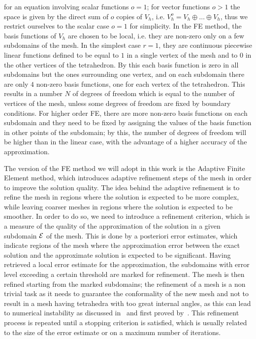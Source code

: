 for an equation involving scalar functions $o=1$; for vector functions $o>1$ the space is given by the direct sum of $o$ copies of $V_h$, i.e. $V_h^o = V_h \oplus \dots \oplus V_h$, thus we restrict ourselves to the scalar case $o=1$ for simplicity. \newline
In the FE method, the basis functions of $V_h$ are chosen to be local, i.e. they are non-zero only on a few subdomains of the mesh.
In the simplest case $r=1$, they are continuous piecewise linear functions defined to be equal to $1$ in a single vertex of the mesh and to $0$ in the other vertices of the tetrahedron. 
By this each basis function is zero in all subdomains but the ones surrounding one vertex, and on each subdomain there are only $4$ non-zero basis functions, one for each vertex of the tetrahedron.
This results in a number $N$ of degrees of freedom which is equal to the number of vertices of the mesh, unless some degrees of freedom are fixed by boundary conditions.
For higher order FE, there are more non-zero basis functions on each subdomain and they need to be fixed by assigning the values of the basis function in other points of the subdomain; by this, the number of degrees of freedom will be higher than in the linear case, with the advantage of a higher accuracy of the approximation. \medskip

The version of the FE method we will adopt in this work is the Adaptive Finite Element method, which introduces adaptive refinement steps of the mesh in order to improve the solution quality.
The idea behind the adaptive refinement is to refine the mesh in regions where the solution is expected to be more complex, while leaving coarser meshes in regions where the solution is expected to be smoother.
In order to do so, we need to introduce a refinement criterion, which is a measure of the quality of the approximation of the solution in a given subdomain $\mathcal E$ of the mesh.
This is done by a posteriori error estimates, which indicate regions of the mesh where the approximation error between the exact solution and the approximate solution is expected to be significant.
Having retrieved a local error estimate for the approximation, the subdomains with error level exceeding a certain threshold are marked for refinement.
The mesh is then refined starting from the marked subdomains; the refinement of a mesh is a non trivial task as it needs to guarantee the conformality of the new mesh and not to result in a mesh having tetrahedra with too great internal angles, as this can lead to numerical instability as discussed in~\cite[Section 4.4.3]{DeuflhardWeiser2012} and first proved by~\cite{SyngeRheinboldt1957}.
This refinement process is repeated until a stopping criterion is satisfied, which is usually related to the size of the error estimate or on a maximum number of iterations.\medskip

